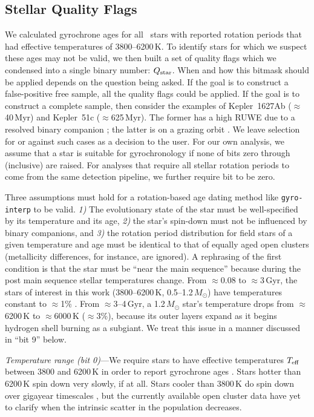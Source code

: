 \documentclass[11pt,twocolumn,tighten,linenumbers,trackchanges]{aastex63}
\begin{document}
\subsection{Stellar Quality Flags}
\label{subsec:flags}
We calculated gyrochrone ages for all \nuniqstarsantosrotteffcut\
stars with reported rotation periods that had effective temperatures
of 3800--6200\,K.  To identify stars for which we suspect these ages
may not be valid, we then built a set of quality flags which we
condensed into a single binary number: $Q_{\rm star}$.  When and how
this bitmask should be applied depends on the question being asked.
If the goal is to construct a false-positive free sample, all the
quality flags could be applied.  If the goal is to construct a
complete sample, then consider the examples of Kepler~1627Ab
($\approx$40\,Myr) and Kepler~51c ($\approx$625\,Myr).  The former has
a high RUWE due to a resolved binary companion \citep{Bouma_2022a};
the latter is on a grazing orbit \citep{2014ApJ...783...53M}.  We
leave selection for or against such cases as a decision to the user.
For our own analysis, we assume that a star is suitable for
gyrochronology if none of bits zero through  (inclusive) are
raised.  For analyses that require all stellar rotation periods to
come from the same detection pipeline, we further require bit  to be
zero. 

Three assumptions must hold for a rotation-based age dating method
like \texttt{gyro-interp} to be valid.  {\it 1)} The evolutionary
state of the star must be well-specified by its temperature and its
age, {\it 2)} the star's spin-down must not be influenced by binary
companions, and {\it 3)} the rotation period distribution for field
stars of a given temperature and age must be identical to that of
equally aged open clusters (metallicity differences, for instance, are
ignored).  A rephrasing of the first condition is that the star must
be ``near the main sequence'' because during the post main sequence
stellar temperatures change.  From $\approx$0.08 to $\approx$3\,Gyr,
the stars of interest in this work (3800--6200\,K,
0.5--1.2\,$M_\odot$) have temperatures constant to $\approx$1\%
\citep{Choi_2016}.  From $\approx$3--4\,Gyr, a 1.2\,$M_\odot$ star's
temperature drops from $\approx$6200\,K to $\approx$6000\,K
($\approx$3\%), because its outer layers expand as it begins hydrogen
shell burning as a subgiant.  We treat this issue in a manner
discussed in ``bit 9'' below.

{\it Temperature range (bit 0)}---We require stars to have effective
temperatures $T_{\rm eff}$ between 3800 and 6200\,K in order to report
gyrochrone ages \citep{Bouma_2023}.   Stars hotter than 6200\,K spin
down very slowly, if at all.  Stars cooler than 3800\,K do spin down
over gigayear timescales
\citep{2016ApJ...821...93N,2023ApJ...954L..50E,2024arXiv240312129C},
but the currently available open cluster data have yet to clarify when
the intrinsic scatter in the population decreases.
\end{document}
